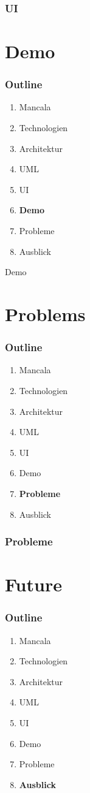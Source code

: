 \documentclass[
	10pt,
	t		%
]{beamer}
\begin{document}
\begin{frame}
\frametitle{UI}

\end{frame}

\section{Demo}
\begin{frame}
\frametitle{Outline}
\begin{enumerate}
\item Mancala
\item Technologien
\item Architektur
\item UML
\item UI
\item \textbf{Demo}
\item Probleme
\item Ausblick
\end{enumerate}
\end{frame}

\begin{frame}[plain, c]
\begin{center}
\Large Demo
\end{center}
\end{frame}

\section{Problems}
\begin{frame}
\frametitle{Outline}
\begin{enumerate}
\item Mancala
\item Technologien
\item Architektur
\item UML
\item UI
\item Demo
\item \textbf{Probleme}
\item Ausblick
\end{enumerate}
\end{frame}

\begin{frame}
\frametitle{Probleme}

\end{frame}

\section{Future}
\begin{frame}
\frametitle{Outline}
\begin{enumerate}
\item Mancala
\item Technologien
\item Architektur
\item UML
\item UI
\item Demo
\item Probleme
\item \textbf{Ausblick}
\end{enumerate}
\end{frame}
\end{document}
